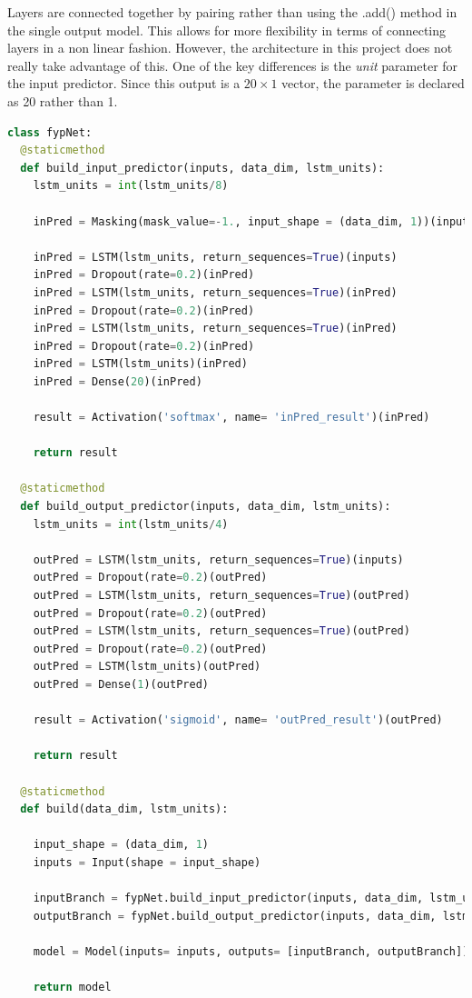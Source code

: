 \documentclass[10pt,onecolumn,letterpaper]{article}
\begin{document}
Layers are connected together by pairing rather than using the .add() method in the single output model. This allows for more flexibility in terms of connecting layers in a non linear fashion. However, the architecture in this project does not really take advantage of this. One of the key differences is the \textit{unit} parameter for the input predictor. Since this output is a $20\times1$ vector, the parameter is declared as 20 rather than 1. \\

\begin{lstlisting}[language=Python, breaklines=true, caption={Structuring of the multi output model, with two branches focused on the separate tasks of predicting the target variable, $y$ and the next input vector, $x_{t+1}$.}]
class fypNet: 
  @staticmethod
  def build_input_predictor(inputs, data_dim, lstm_units):
    lstm_units = int(lstm_units/8)

    inPred = Masking(mask_value=-1., input_shape = (data_dim, 1))(inputs)
    
    inPred = LSTM(lstm_units, return_sequences=True)(inputs)
    inPred = Dropout(rate=0.2)(inPred)
    inPred = LSTM(lstm_units, return_sequences=True)(inPred)
    inPred = Dropout(rate=0.2)(inPred)
    inPred = LSTM(lstm_units, return_sequences=True)(inPred)
    inPred = Dropout(rate=0.2)(inPred)
    inPred = LSTM(lstm_units)(inPred)    
    inPred = Dense(20)(inPred)
    
    result = Activation('softmax', name= 'inPred_result')(inPred)
    
    return result
    
  @staticmethod
  def build_output_predictor(inputs, data_dim, lstm_units): 
    lstm_units = int(lstm_units/4)
    
    outPred = LSTM(lstm_units, return_sequences=True)(inputs)
    outPred = Dropout(rate=0.2)(outPred)
    outPred = LSTM(lstm_units, return_sequences=True)(outPred)
    outPred = Dropout(rate=0.2)(outPred)
    outPred = LSTM(lstm_units, return_sequences=True)(outPred)
    outPred = Dropout(rate=0.2)(outPred)
    outPred = LSTM(lstm_units)(outPred)    
    outPred = Dense(1)(outPred)
    
    result = Activation('sigmoid', name= 'outPred_result')(outPred)
   
    return result
  
  @staticmethod
  def build(data_dim, lstm_units):
         
    input_shape = (data_dim, 1)
    inputs = Input(shape = input_shape)
   
    inputBranch = fypNet.build_input_predictor(inputs, data_dim, lstm_units)
    outputBranch = fypNet.build_output_predictor(inputs, data_dim, lstm_units)
    
    model = Model(inputs= inputs, outputs= [inputBranch, outputBranch])
    
    return model
\end{lstlisting} 
\end{document}
